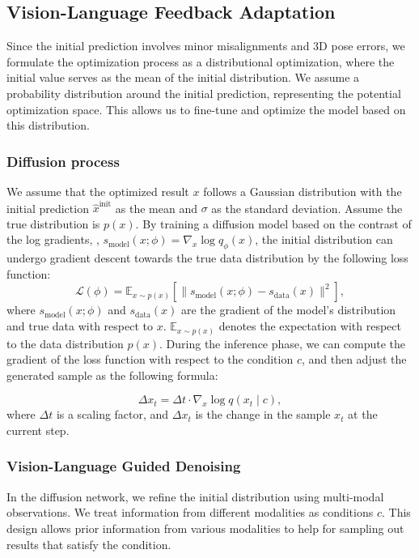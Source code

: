 {\subsection{Vision-Language Feedback Adaptation}

Since the initial prediction involves minor misalignments and 3D pose errors, we formulate the optimization process as a distributional optimization, where the initial value serves as the mean of the initial distribution. We assume a probability distribution around the initial prediction, representing the potential optimization space. This allows us to fine-tune and optimize the model based on this distribution.

\subsubsection{Diffusion process} We assume that the optimized result $x$ follows a Gaussian distribution with the initial prediction \( \hat{x}^{\text{init}} \) as the mean and \( \sigma \) as the standard deviation. Assume the true distribution is $p(x)$. By training a diffusion model based on the contrast of the log gradients, \ie, $s_{\text{model}}(x; \phi) = \nabla_x \log q_\phi(x)$, the initial distribution can undergo gradient descent towards the true data distribution by the following loss function:
\begin{equation}
\mathcal{L}(\phi) = \mathbb{E}_{x \sim p(x)} \left[ \| s_{\text{model}}(x; \phi) - s_{\text{data}}(x) \|^2 \right],
\end{equation}
where \( s_{\text{model}}(x; \phi) \) and \( s_{\text{data}}(x) \) are the gradient of the model's distribution and true data with respect to \( x \). \( \mathbb{E}_{x \sim p(x)} \) denotes the expectation with respect to the data distribution \( p(x) \). During the inference phase, we can compute the gradient of the loss function with respect to the condition \( c \), and then adjust the generated sample as the following formula:

\begin{equation}
\Delta x_t = \Delta t \cdot \nabla_x \log q(x_t \mid c),
\end{equation}
where $\Delta t$ is a scaling factor, and  $\Delta x_t$ is the change in the sample $x_t$ at the current step.

\subsubsection{Vision-Language Guided Denoising} In the diffusion network, we refine the initial distribution using multi-modal observations. We treat information from different modalities as conditions 
$c$. This design allows prior information from various modalities to help for sampling out results that satisfy the condition.

}
